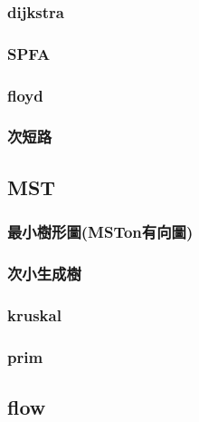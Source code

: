 \subsubsection{dijkstra}


\subsubsection{SPFA}


\subsubsection{floyd}


\subsubsection{次短路}



\subsection{MST}

\subsubsection{最小樹形圖(MSTon有向圖)}


\subsubsection{次小生成樹}


\subsubsection{kruskal}


\subsubsection{prim}



\subsection{flow}

